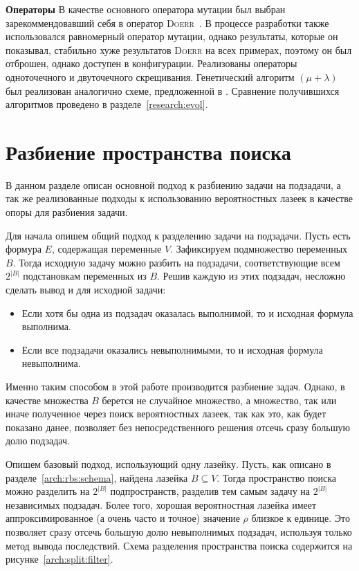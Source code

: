 \textbf{Операторы}
В качестве основного оператора мутации был выбран зарекоммендовавший себя в  оператор
\textsc{Doerr}~\cite{bib:doerr}. В процессе разработки также использовался равномерный оператор
мутации, однако результаты, которые он показывал, стабильно хуже результатов \textsc{Doerr} на
всех примерах, поэтому он был отброшен, однако доступен в конфигурации. Реализованы операторы
одноточечного и двуточечного скрещивания. Генетический алгоритм $(\mu + \lambda)$ был
реализован аналогично схеме, предложенной в . Сравнение получившихся алгоритмов
проведено в разделе~\ref{research:evol}.

\section{Разбиение пространства поиска}\label{arch:split}

В данном разделе описан основной подход к разбиению задачи на подзадачи, а так же реализованные
подходы к использованию вероятностных лазеек в качестве опоры для разбиения задачи.

Для начала опишем общий подход к разделению задачи на подзадачи. Пусть есть формура $E$, 
содержащая переменные $V$. Зафиксируем подмножество переменных $B$. Тогда исходную
задачу можно разбить на подзадачи, соответствующие всем $2^{|B|}$ подстановкам переменных из $B$.
Решив каждую из этих подзадач, несложно сделать вывод и для исходной задачи:
\begin{itemize}
    \item Если хотя бы одна из подзадач оказалась выполнимой, то и исходная формула выполнима.
    \item Если все подзадачи оказались невыполнимыми, то и исходная формула невыполнима.
\end{itemize}

Именно таким способом в этой работе производится разбиение задач. Однако, в качестве множества
$B$ берется не случайное множество, а множество, так или иначе полученное через поиск вероятностных
лазеек, так как это, как будет показано данее, позволяет без непосредственного решения отсечь сразу
большую долю подзадач.

Опишем базовый подход, использующий одну лазейку. Пусть, как описано в
разделе~\ref{arch:rbs:schema}, найдена лазейка $B \subseteq V$. Тогда пространство поиска можно разделить
на $2^{|B|}$ подпространств, разделив тем самым задачу на $2^{|B|}$ независимых подзадач. Более 
того, хорошая вероятностная лазейка имеет аппроксимированное (а очень часто и точное) значение 
$\rho$ близкое к единице. Это позволяет сразу отсечь большую долю невыполнимых подзадач, используя 
только метод вывода последствий. Схема разделения пространства поиска содержится на 
рисунке~\ref{arch:split:filter}.

